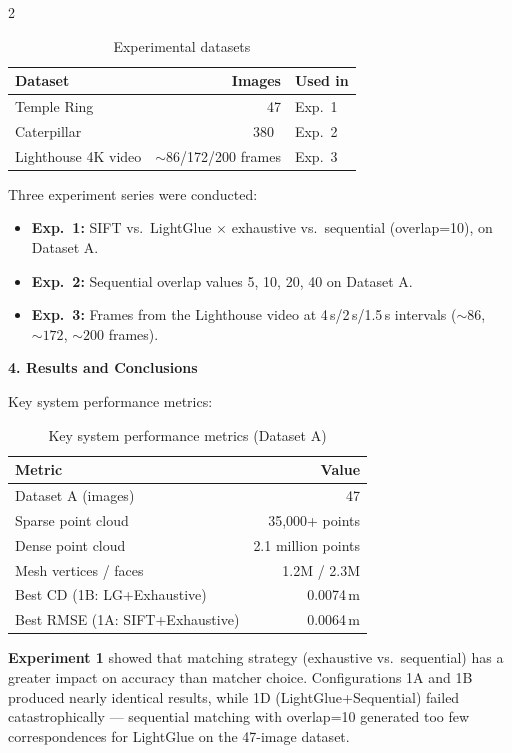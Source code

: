\begin{multicols}{2}
\begin{table}[H]
\centering
\caption{Experimental datasets}
\label{tab:summary_en_datasets}
\scriptsize
\setlength{\tabcolsep}{3pt}
\begin{tabular}{|l|r|l|}
\hline
\textbf{Dataset} & \textbf{Images} & \textbf{Used in} \\ \hline
Temple Ring & 47 & Exp.\ 1 \\ \hline
Caterpillar & 380~ & Exp.\ 2 \\ \hline
Lighthouse 4K video & ${\sim}$86/172/200 frames & Exp.\ 3 \\ \hline
\end{tabular}
\end{table}

Three experiment series were conducted:
\begin{itemize}
    \item \textbf{Exp.\ 1:} SIFT vs.\ LightGlue $\times$ exhaustive vs.\ sequential (overlap=10), on Dataset A.
    \item \textbf{Exp.\ 2:} Sequential overlap values 5, 10, 20, 40 on Dataset A.
    \item \textbf{Exp.\ 3:} Frames from the Lighthouse video at 4\,s/2\,s/1.5\,s intervals (${\sim}86$, ${\sim}172$, ${\sim}200$ frames).
\end{itemize}

\noindent\textbf{4. Results and Conclusions}

Key system performance metrics:

\begin{table}[H]
\centering
\caption{Key system performance metrics (Dataset A)}
\label{tab:summary_en_results}
\scriptsize
\setlength{\tabcolsep}{3pt}
\begin{tabular}{|l|r|}
\hline
\textbf{Metric} & \textbf{Value} \\ \hline
Dataset A (images) & 47 \\ \hline
Sparse point cloud & 35{,}000+ points \\ \hline
Dense point cloud & 2.1 million points \\ \hline
Mesh vertices / faces & 1.2M / 2.3M \\ \hline
Best CD (1B: LG+Exhaustive) & 0.0074\,m \\ \hline
Best RMSE (1A: SIFT+Exhaustive) & 0.0064\,m \\ \hline
\end{tabular}
\end{table}

\textbf{Experiment 1} showed that matching strategy (exhaustive vs.\ sequential) has a greater impact on accuracy than matcher choice. Configurations 1A and 1B produced nearly identical results, while 1D (LightGlue+Sequential) failed catastrophically --- sequential matching with overlap=10 generated too few correspondences for LightGlue on the 47-image dataset.

\end{multicols}

